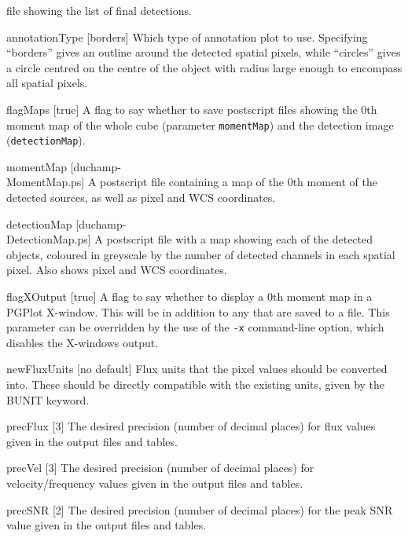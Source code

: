 \begin{Lentry}
  file showing the list of final detections.
\item[{annotationType [borders]}] Which type of annotation plot to
  use. Specifying ``borders'' gives an outline around the detected
  spatial pixels, while ``circles'' gives a circle centred on the
  centre of the object with radius large enough to encompass all
  spatial pixels.
\item[{flagMaps [true]}] A flag to say whether to save
  postscript files showing the 0th moment map of the whole cube
  (parameter \texttt{momentMap}) and the detection image
  (\texttt{detectionMap}).
\item[{momentMap [duchamp-\\MomentMap.ps]}] A postscript file
  containing a map of the 0th moment of the detected sources, as well
  as pixel and WCS coordinates.
\item[{detectionMap [duchamp-\\DetectionMap.ps]}] A postscript
  file with a map showing each of the detected objects, coloured in
  greyscale by the number of detected channels in each spatial
  pixel. Also shows pixel and WCS coordinates.
\item[{flagXOutput [true]}] A flag to say whether to display a
  0th moment map in a PGPlot X-window. This will be in addition to any
  that are saved to a file. This parameter can be overridden by the
  use of the \texttt{-x} command-line option, which disables the
  X-windows output.
\item[{newFluxUnits [no default]}] Flux units that the pixel values
  should be converted into. These should be directly compatible with
  the existing units, given by the BUNIT keyword.
\item[{precFlux [3]}] The desired precision (\ie number of decimal
  places) for flux values given in the output files and tables.
\item[{precVel [3]}] The desired precision (\ie number of decimal
  places) for velocity/frequency values given in the output files and
  tables.
\item[{precSNR [2]}] The desired precision (\ie number of decimal
  places) for the peak SNR value given in the output files and tables.
\end{Lentry}

